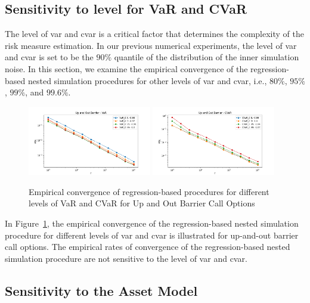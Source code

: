 \subsection{Sensitivity to level for VaR and CVaR}\label{sec1:sensitivity-level}

The level of \gls{var} and \gls{cvar} is a critical factor that determines the complexity of the risk measure estimation.
In our previous numerical experiments, the level of \gls{var} and \gls{cvar} is set to be the $90\%$ quantile of the distribution of the inner simulation noise.
In this section, we examine the empirical convergence of the regression-based nested simulation procedures for other levels of \gls{var} and \gls{cvar}, i.e., $80\%$, $95\%$, $99\%$, and $99.6\%$.

\begin{figure}[ht!] 
    \centering
    \includegraphics[width=0.48\textwidth]{./project1/figures/figure9a.png}
    \includegraphics[width=0.48\textwidth]{./project1/figures/figure9b.png}
    \caption{Empirical convergence of regression-based procedures for different levels of VaR and CVaR for Up and Out Barrier Call Options}
\label{fig1:sens_level}
\end{figure}

In Figure~\ref{fig1:sens_level}, the empirical convergence of the regression-based nested simulation procedure for different levels of \gls{var} and \gls{cvar} is illustrated for up-and-out barrier call options.
The empirical rates of convergence of the regression-based nested simulation procedure are not sensitive to the level of \gls{var} and \gls{cvar}.

\subsection{Sensitivity to the Asset Model}\label{sec1:sensitivity-assetModel}


